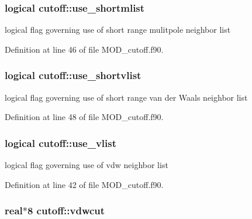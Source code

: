 \hypertarget{classcutoff_a98b34e44f9906503e22e8e709639b943}{
\subsubsection[{use\-\_\-shortmlist}]{\setlength{\rightskip}{0pt plus 5cm}logical cutoff\-::use\-\_\-shortmlist}}\label{classcutoff_a98b34e44f9906503e22e8e709639b943}


logical flag governing use of short range mulitpole neighbor list 



Definition at line 46 of file M\-O\-D\-\_\-cutoff.\-f90.

\hypertarget{classcutoff_ac023f2c34db51f8df3d3cfb95315adcf}{
\subsubsection[{use\-\_\-shortvlist}]{\setlength{\rightskip}{0pt plus 5cm}logical cutoff\-::use\-\_\-shortvlist}}\label{classcutoff_ac023f2c34db51f8df3d3cfb95315adcf}


logical flag governing use of short range van der Waals neighbor list 



Definition at line 48 of file M\-O\-D\-\_\-cutoff.\-f90.

\hypertarget{classcutoff_a6e39a257df09552614d105bf3adfd0b2}{
\subsubsection[{use\-\_\-vlist}]{\setlength{\rightskip}{0pt plus 5cm}logical cutoff\-::use\-\_\-vlist}}\label{classcutoff_a6e39a257df09552614d105bf3adfd0b2}


logical flag governing use of vdw neighbor list 



Definition at line 42 of file M\-O\-D\-\_\-cutoff.\-f90.

\hypertarget{classcutoff_a931958c0426a4246d73339c2b249bdcc}{
\subsubsection[{vdwcut}]{\setlength{\rightskip}{0pt plus 5cm}real$\ast$8 cutoff\-::vdwcut}}\label{classcutoff_a931958c0426a4246d73339c2b249bdcc}


